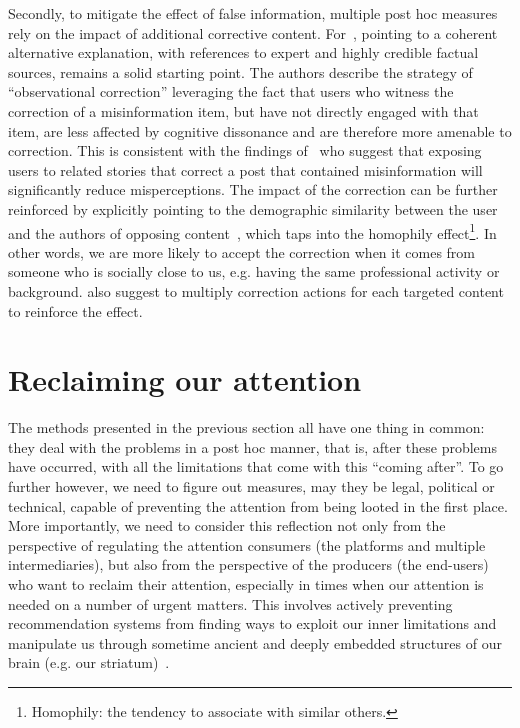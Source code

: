 \documentclass[10pt]{article}
\begin{document}
Secondly, to mitigate the effect of false information, multiple post hoc measures rely on the impact of additional corrective content. %
For~\cite{vraga2020correction}, pointing to a coherent alternative explanation, with references to expert and highly credible factual sources, remains a solid starting point.
The authors describe the strategy of ``observational correction'' leveraging the fact that users who witness the correction of a misinformation item, but have not directly engaged with that item, are less affected by cognitive dissonance and are therefore more amenable to correction.
%
This is consistent with the findings of~\cite{bode2015erratum} who suggest that exposing users to related stories that correct a post that contained misinformation will significantly reduce misperceptions. 
The impact of the correction can be further reinforced by explicitly pointing to the demographic similarity between the user and the authors of opposing content~\cite{garrett2013undermining}, which taps into the homophily effect\footnote{Homophily: the tendency to associate with similar others.}.
In other words, we are more likely to accept the correction when it comes from someone who is socially close to us,  e.g. having the same professional activity or background.
\cite{vraga2020correction} also suggest to multiply correction actions for each targeted content to reinforce the effect. 



\section{Reclaiming our attention}
\label{sec:redirect}

The methods presented in the previous section all have one thing in common: they deal with the problems in a post hoc manner, that is, after these problems have occurred, with all the limitations that come with this ``coming after''.
%
To go further however, we need to figure out measures, may they be legal, political or technical, capable of preventing the attention from being looted in the first place.
More importantly, we need to consider this reflection not only from the perspective of regulating the attention consumers (the platforms and multiple intermediaries), but also from the perspective of the producers (the end-users) who want to reclaim their attention, especially in times when our attention is needed on a number of urgent matters.
This involves actively preventing recommendation systems from finding ways to exploit our inner limitations and manipulate us through sometime ancient and deeply embedded structures of our brain (e.g. our striatum)~\cite{bohler2019bug}.
\end{document}
